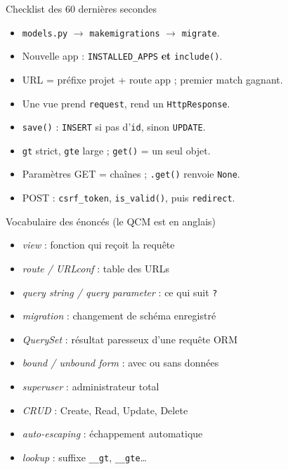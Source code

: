 \documentclass[a4paper,10pt]{article}
\newcommand{\co}[1]{\texttt{\textcolor{codefg}{#1}}}
\begin{document}
\vspace{0.3em}
\begin{astucebox}{Checklist des 60 dernières secondes}
\begin{minipage}[t]{0.485\linewidth}
\begin{itemize}
  \item \co{models.py} $\to$ \co{makemigrations} $\to$ \co{migrate}.
  \item Nouvelle app : \co{INSTALLED\_APPS} \textbf{et} \co{include()}.
  \item URL = préfixe projet + route app ; premier match gagnant.
  \item Une vue prend \co{request}, rend un \co{HttpResponse}.
\end{itemize}
\end{minipage}\hfill
\begin{minipage}[t]{0.485\linewidth}
\begin{itemize}
  \item \co{save()} : \co{INSERT} si pas d'\co{id}, sinon \co{UPDATE}.
  \item \co{gt} strict, \co{gte} large ; \co{get()} = un seul objet.
  \item Paramètres GET = chaînes ; \co{.get()} renvoie \co{None}.
  \item POST : \co{csrf\_token}, \co{is\_valid()}, puis \co{redirect}.
\end{itemize}
\end{minipage}
\end{astucebox}

\vspace{0.4em}
\begin{astucebox}{Vocabulaire des énoncés (le QCM est en anglais)}
\begin{minipage}[t]{0.485\linewidth}
\begin{itemize}
  \item \emph{view} : fonction qui reçoit la requête
  \item \emph{route / URLconf} : table des URLs
  \item \emph{query string / query parameter} : ce qui suit \co{?}
  \item \emph{migration} : changement de schéma enregistré
  \item \emph{QuerySet} : résultat paresseux d'une requête ORM
\end{itemize}
\end{minipage}\hfill
\begin{minipage}[t]{0.485\linewidth}
\begin{itemize}
  \item \emph{bound / unbound form} : avec ou sans données
  \item \emph{superuser} : administrateur total
  \item \emph{CRUD} : Create, Read, Update, Delete
  \item \emph{auto-escaping} : échappement automatique
  \item \emph{lookup} : suffixe \co{\_\_gt}, \co{\_\_gte}\dots
\end{itemize}
\end{minipage}
\end{astucebox}
\end{document}
